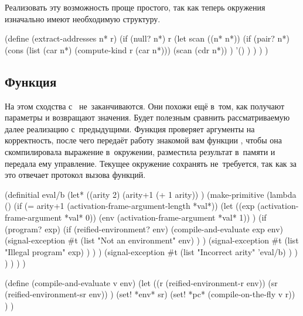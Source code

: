 
Реализовать эту возможность проще простого, так как теперь окружения изначально
имеют необходимую структуру.

\begin{code:lisp}
(define (extract-addresses n* r)
  (if (null? n*) r
      (let scan ((n* n*))
        (if (pair? n*)
            (cons (list (car n*) (compute-kind r (car n*)))
                  (scan (cdr n*)) )
            '() ) ) ) )
\end{code:lisp}


\subsection{\texorpdfstring{Функция \protect{}}{Функция eval/b}}%
\label{reflection/reify-env/ssect:eval/b}

На этом сходства  с~ не~заканчиваются. Они похожи ещё
в~том, как получают параметры и возвращают значения. Будет полезным сравнить
рассматриваемую далее реализацию  с~предыдущими. Функция 
проверяет аргументы на корректность, после чего передаёт работу знакомой вам
функции , чтобы она скомпилировала выражение в~окружении,
разместила результат в~памяти и передала ему управление. Текущее окружение
сохранять не~требуется, так как за это отвечает протокол вызова функций.

\begin{code:lisp}
(definitial eval/b
  (let* ((arity 2)
         (arity+1 (+ 1 arity)) )
    (make-primitive
      (lambda ()
        (if (= arity+1 (activation-frame-argument-length *val*))
            (let ((exp (activation-frame-argument *val* 0))
                  (env (activation-frame-argument *val* 1)) )
              (if (program? exp)
                  (if (reified-environment? env)
                      (compile-and-evaluate exp env)
                      (signal-exception
                       #t (list "Not an environment" env) ) )
                  (signal-exception
                   #t (list "Illegal program" exp) ) ) )
            (signal-exception
             #t (list "Incorrect arity" 'eval/b) ) ) ) ) ) )

(define (compile-and-evaluate v env)
  (let ((r (reified-environment-r env))
        (sr (reified-environment-sr env)) )
    (set! *env* sr)
    (set! *pc* (compile-on-the-fly v r)) ) )
\end{code:lisp}


